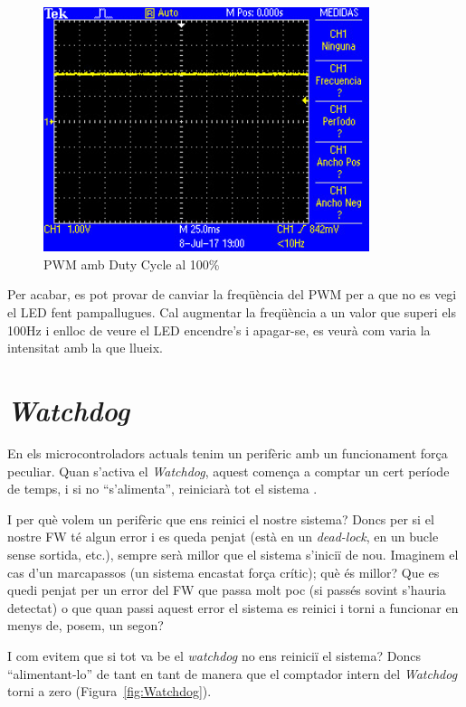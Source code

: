 \begin{figure}
 \centering
 \includegraphics[width=0.85\textwidth, keepaspectratio]{imatges/DutyCycle4.png}
 \caption{PWM amb Duty Cycle al 100\%}
 \label{fig:DutyCycle4}
\end{figure}

Per acabar, es pot provar de canviar la freqüència del \gls{PWM} per a que no es vegi el LED fent pampallugues. Cal augmentar la freqüència a un valor que superi els 100Hz i enlloc de veure el LED encendre's i apagar-se, es veurà com varia la intensitat amb la que llueix.

\chapter{\em Watchdog}
\label{sec:Watchdog}
En els microcontroladors actuals tenim un perifèric amb un funcionament força peculiar. Quan s'activa el {\em \gls{Watchdog}}, aquest comença a comptar un cert període de temps, i si no “s'alimenta”, reiniciarà tot el sistema \cite[123]{EFM32GRM}\cite[709]{STM32F4RM}.

I per què volem un perifèric que ens reinici el nostre sistema? Doncs per si el nostre \gls{FW} té algun error i es queda penjat (està en un {\em \gls{dead-lock}}, en un bucle sense sortida, etc.), sempre serà millor que el sistema s'iniciï de nou. Imaginem el cas d'un marcapassos (un sistema encastat força crític); què és millor? Que es quedi penjat per un error del \gls{FW} que passa molt poc (si passés sovint s'hauria detectat) o que quan passi aquest error el sistema es reinici i torni a funcionar en menys de, posem, un segon?

I com evitem que si tot va be el {\em watchdog} no ens reiniciï el sistema? Doncs “alimentant-lo” de tant en tant de manera que el comptador intern del {\em Watchdog} torni a zero (Figura~\ref{fig:Watchdog}).

